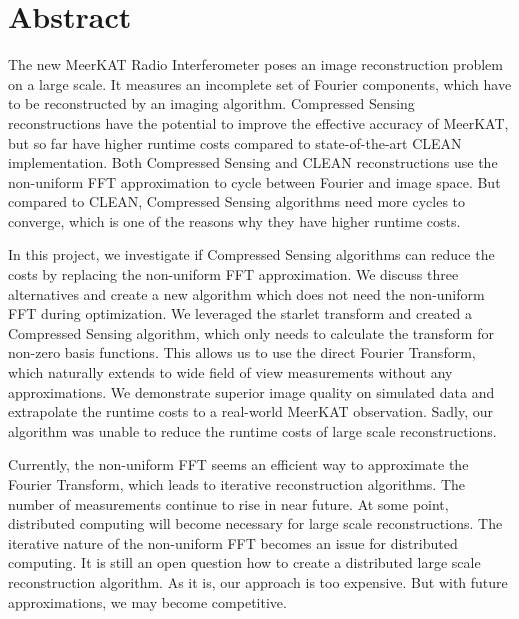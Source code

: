 \section*{Abstract}
The new MeerKAT Radio Interferometer poses an image reconstruction problem on a large scale. It measures an incomplete set of Fourier components, which have to be reconstructed by an imaging algorithm.  Compressed Sensing reconstructions have the potential to improve the effective accuracy of MeerKAT, but so far have higher runtime costs compared to state-of-the-art CLEAN implementation. Both Compressed Sensing and CLEAN reconstructions use the non-uniform FFT approximation to cycle between Fourier and image space. But compared to CLEAN, Compressed Sensing algorithms need more cycles to converge, which is one of the reasons why they have higher runtime costs.

In this project, we investigate if Compressed Sensing algorithms can reduce the costs by replacing the non-uniform FFT approximation. We discuss three alternatives and create a new algorithm which does not need the non-uniform FFT during optimization. We leveraged the starlet transform and created a Compressed Sensing algorithm, which only needs to calculate the transform for non-zero basis functions. This allows us to use the direct Fourier Transform, which naturally extends to wide field of view measurements without any approximations. We demonstrate superior image quality on simulated data and extrapolate the runtime costs to a real-world MeerKAT observation. Sadly, our algorithm was unable to reduce the runtime costs of large scale reconstructions.



Currently, the non-uniform FFT seems an efficient way to approximate the Fourier Transform, which leads to iterative reconstruction algorithms. The number of measurements continue to rise in near future. At some point, distributed computing will become necessary for large scale reconstructions. The iterative nature of the non-uniform FFT becomes an issue for distributed computing. It is still an open question how to create a distributed large scale reconstruction algorithm. As it is, our approach is too expensive. But with future approximations, we may become competitive.
